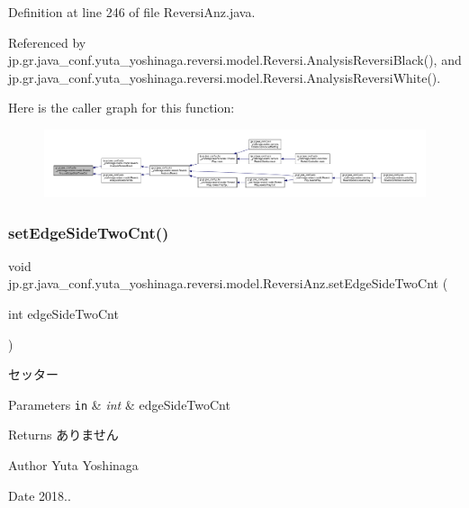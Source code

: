 Definition at line 246 of file Reversi\+Anz.\+java.



Referenced by jp.\+gr.\+java\+\_\+conf.\+yuta\+\_\+yoshinaga.\+reversi.\+model.\+Reversi.\+Analysis\+Reversi\+Black(), and jp.\+gr.\+java\+\_\+conf.\+yuta\+\_\+yoshinaga.\+reversi.\+model.\+Reversi.\+Analysis\+Reversi\+White().

Here is the caller graph for this function\+:
\nopagebreak
\begin{figure}[H]
\begin{center}
\leavevmode
\includegraphics[width=350pt]{classjp_1_1gr_1_1java__conf_1_1yuta__yoshinaga_1_1reversi_1_1model_1_1_reversi_anz_afb1fe81327e740d133aa623902cacab0_icgraph}
\end{center}
\end{figure}
\mbox{\label{classjp_1_1gr_1_1java__conf_1_1yuta__yoshinaga_1_1reversi_1_1model_1_1_reversi_anz_ae08ab4f24718ec5f1f84bd0f26da41fd}} 
\subsubsection{\texorpdfstring{set\+Edge\+Side\+Two\+Cnt()}{setEdgeSideTwoCnt()}}
{\footnotesize\ttfamily void jp.\+gr.\+java\+\_\+conf.\+yuta\+\_\+yoshinaga.\+reversi.\+model.\+Reversi\+Anz.\+set\+Edge\+Side\+Two\+Cnt (\begin{DoxyParamCaption}\item[{int}]{edge\+Side\+Two\+Cnt }\end{DoxyParamCaption})}



セッター 


\begin{DoxyParams}[1]{Parameters}
\mbox{\tt in}  & {\em int} & edge\+Side\+Two\+Cnt \\
\hline
\end{DoxyParams}
\begin{DoxyReturn}{Returns}
ありません 
\end{DoxyReturn}
\begin{DoxyAuthor}{Author}
Yuta Yoshinaga 
\end{DoxyAuthor}
\begin{DoxyDate}{Date}
2018.. 
\end{DoxyDate}


